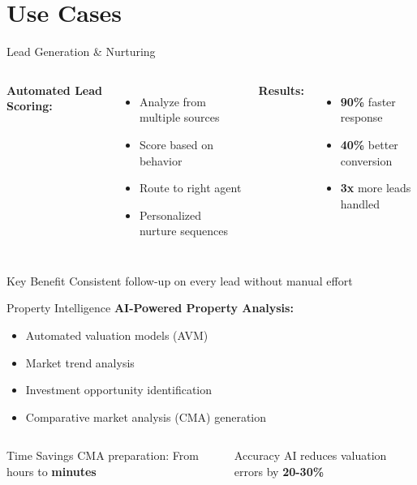 \documentclass{beamer}
\begin{document}
\section{Use Cases}

\begin{frame}{Lead Generation \& Nurturing}
  \begin{columns}[onlytextwidth]
      \textbf{Automated Lead Scoring:}
      \begin{itemize}
        \item Analyze from multiple sources
        \item Score based on behavior
        \item Route to right agent
        \item Personalized nurture sequences
      \end{itemize}
      
      \textbf{Results:}
      \begin{itemize}
        \item \textbf{90\%} faster response
        \item \textbf{40\%} better conversion
        \item \textbf{3x} more leads handled
      \end{itemize}
  \end{columns}
  
  \vspace{0.3cm}
  \begin{block}{Key Benefit}
    Consistent follow-up on every lead without manual effort
  \end{block}
\end{frame}

\begin{frame}{Property Intelligence}
  \textbf{AI-Powered Property Analysis:}
  \begin{itemize}
    \item Automated valuation models (AVM)
    \item Market trend analysis
    \item Investment opportunity identification
    \item Comparative market analysis (CMA) generation
  \end{itemize}
  
  \vspace{0.3cm}
  
  \begin{columns}[onlytextwidth]
      \begin{block}{Time Savings}
        CMA preparation: From hours to \textbf{minutes}
      \end{block}
    
      \begin{block}{Accuracy}
        AI reduces valuation errors by \textbf{20-30\%}
      \end{block}
  \end{columns}
\end{frame}
\end{document}
